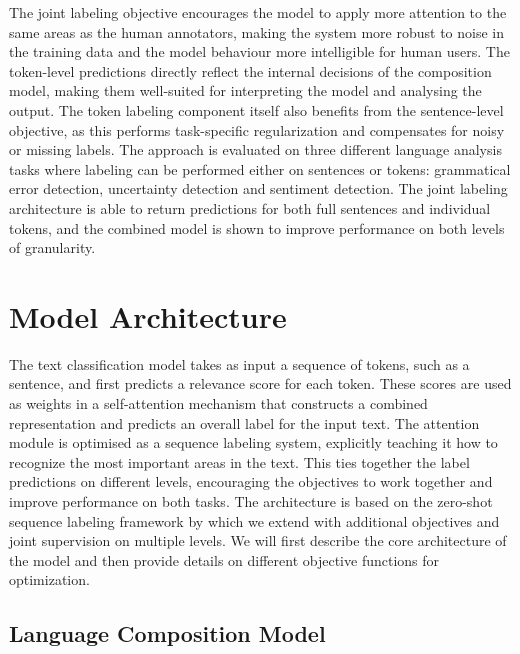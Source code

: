 \documentclass[letterpaper]{article} \usepackage{aaai19}  \usepackage{times}  \usepackage{helvet}  \usepackage{courier}  \usepackage{graphicx}
\begin{document}
The joint labeling objective encourages the model to apply more attention to the same areas as the human annotators, making the system more robust to noise in the training data and the model behaviour more intelligible for human users.
The token-level predictions directly reflect the internal decisions of the composition model, making them well-suited for interpreting the model and analysing the output.
The token labeling component itself also benefits from the sentence-level objective, as this performs task-specific regularization and compensates for noisy or missing labels.
The approach is evaluated on three different language analysis tasks where labeling can be performed either on sentences or tokens: grammatical error detection, uncertainty detection and sentiment detection.
The joint labeling architecture is able to return predictions for both full sentences and individual tokens, and the combined model is shown to improve performance on both levels of granularity.














\section{Model Architecture}
\label{sec:model}


The text classification model takes as input a sequence of tokens, such as a sentence, and first predicts a relevance score for each token.
These scores are used as weights in a self-attention mechanism that constructs a combined representation and predicts an overall label for the input text.
The attention module is optimised as a sequence labeling system, explicitly teaching it how to recognize the most important areas in the text.
This ties together the label predictions on different levels, encouraging the objectives to work together and improve performance on both tasks.
The architecture is based on the zero-shot sequence labeling framework by \citet{rei2018zero} which we extend with additional objectives and joint supervision on multiple levels.
We will first describe the core architecture of the model and then provide details on different objective functions for optimization.





\subsection{Language Composition Model}
\label{sec:modelcomp}
\end{document}

